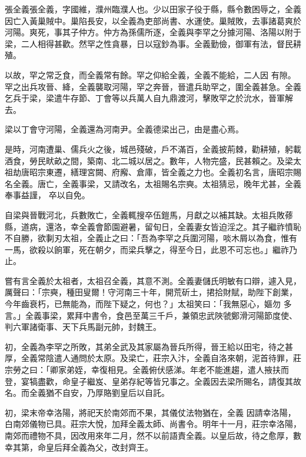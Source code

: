 
\begin{pinyinscope}

 張全義張全義，字國維，濮州臨濮人也。少以田家子役于縣，縣令數困辱之，全義因亡入黃巢賊中。巢陷長安，以全義為吏部尚書、水運使。巢賊敗，去事諸葛爽於河陽。爽死，事其子仲方。仲方為孫儒所逐，全義與李罕之分據河陽、洛陽以附于梁，二人相得甚歡。然罕之性貪暴，日以寇鈔為事。全義勤儉，御軍有法，督民耕殖。



 以故，罕之常乏食，而全義常有餘。罕之仰給全義，全義不能給，二人因
 有隙。罕之出兵攻晉、絳，全義襲取河陽，罕之奔晉，晉遣兵助罕之，圍全義甚急。全義乞兵于梁，梁遣牛存節、丁會等以兵萬人自九鼎渡河，擊敗罕之於沇水，晉軍解去。



 梁以丁會守河陽，全義還為河南尹。全義德梁出己，由是盡心焉。



 是時，河南遭巢、儒兵火之後，城邑殘破，戶不滿百，全義披荊棘，勸耕殖，躬載酒食，勞民畎畝之間，築南、北二城以居之。數年，人物完盛，民甚賴之。及梁太祖劫唐昭宗東遷，繕理宮闕、府廨、倉庫，皆全義之力也。全義初名言，唐昭宗賜名全義。唐亡，全義事梁，又請改名，太祖賜名宗奭。太祖猜忌，晚年尤甚，全義奉事益謹，
 卒以自免。



 自梁與晉戰河北，兵數敗亡，全義輒搜卒伍鎧馬，月獻之以補其缺。太祖兵敗蓚縣，道病，還洛，幸全義會節園避暑，留旬日，全義妻女皆迫淫之。其子繼祚憤恥不自勝，欲剚刃太祖，全義止之曰：「吾為李罕之兵圍河陽，啖木屑以為食，惟有一馬，欲殺以餉軍，死在朝夕，而梁兵擊之，得至今日，此恩不可忘也。」繼祚乃止。



 嘗有言全義於太祖者，太祖召全義，其意不測。全義妻儲氏明敏有口辯，遽入見，厲聲曰：「宗奭，種田叟爾！守河南三十年，開荒斫土，捃拾財賦，助陛下創業，今年齒衰朽，已無能為，而陛下疑之，何也？」太祖笑曰：「我無惡心，嫗勿
 多言。」全義事梁，累拜中書令，食邑至萬三千戶，兼領忠武陜虢鄭滑河陽節度使、判六軍諸衛事、天下兵馬副元帥，封魏王。



 初，全義為李罕之所敗，其弟全武及其家屬為晉兵所得，晉王給以田宅，待之甚厚，全義常陰遣人通問於太原。及梁亡，莊宗入汴，全義自洛來朝，泥首待罪，莊宗勞之曰：「卿家弟姪，幸復相見。全義俯伏感涕。年老不能進趨，遣人掖扶而登，宴犒盡歡，命皇子繼岌、皇弟存紀等皆兄事之。全義因去梁所賜名，請復其故名。而全義猶不自安，乃厚賂劉皇后以自託。



 初，梁末帝幸洛陽，將祀天於南郊而不果，其儀仗法物猶在，全義
 因請幸洛陽，白南郊儀物已具。莊宗大悅，加拜全義太師、尚書令。明年十一月，莊宗幸洛陽，南郊而禮物不具，因改用來年二月，然不以前語責全義。以皇后故，待之愈厚，數幸其第，命皇后拜全義為父，改封齊王。




\end{pinyinscope}
